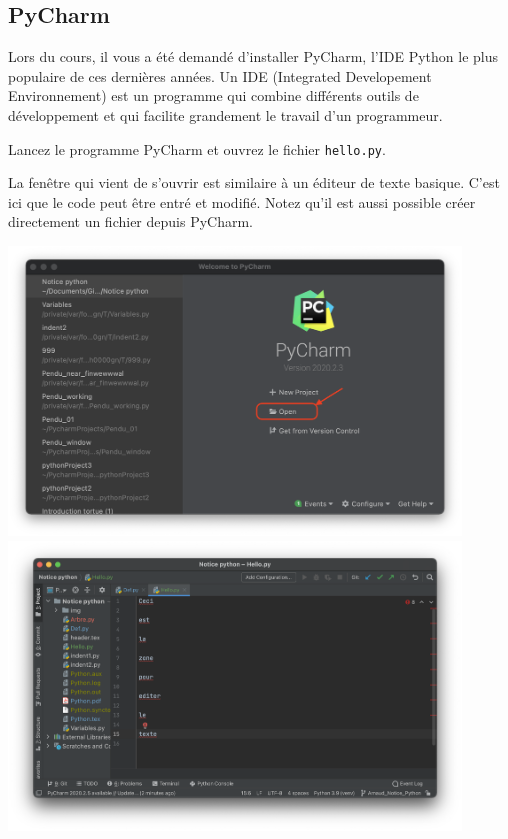 \subsection{PyCharm}

Lors du cours, il vous a été demandé d'installer PyCharm, l'IDE Python le plus populaire de ces dernières années. Un IDE (Integrated Developement Environnement) est un programme qui combine différents outils de développement et qui facilite grandement le travail d'un programmeur.
\\
\begin{Exercice}[5 minutes]

Lancez le programme PyCharm et ouvrez le fichier \lstinline{hello.py}.

\begin{solution}

La fenêtre qui vient de s'ouvrir est similaire à un éditeur de texte basique. C'est ici que le code peut être entré et modifié.  Notez qu'il est aussi possible créer directement un fichier depuis PyCharm.
\begin{center}
	\includegraphics[width=12cm]{PyCharm1.png}	
	\includegraphics[width=12cm]{zone.png}	
\end{center}
\end{solution}
\end{Exercice}


